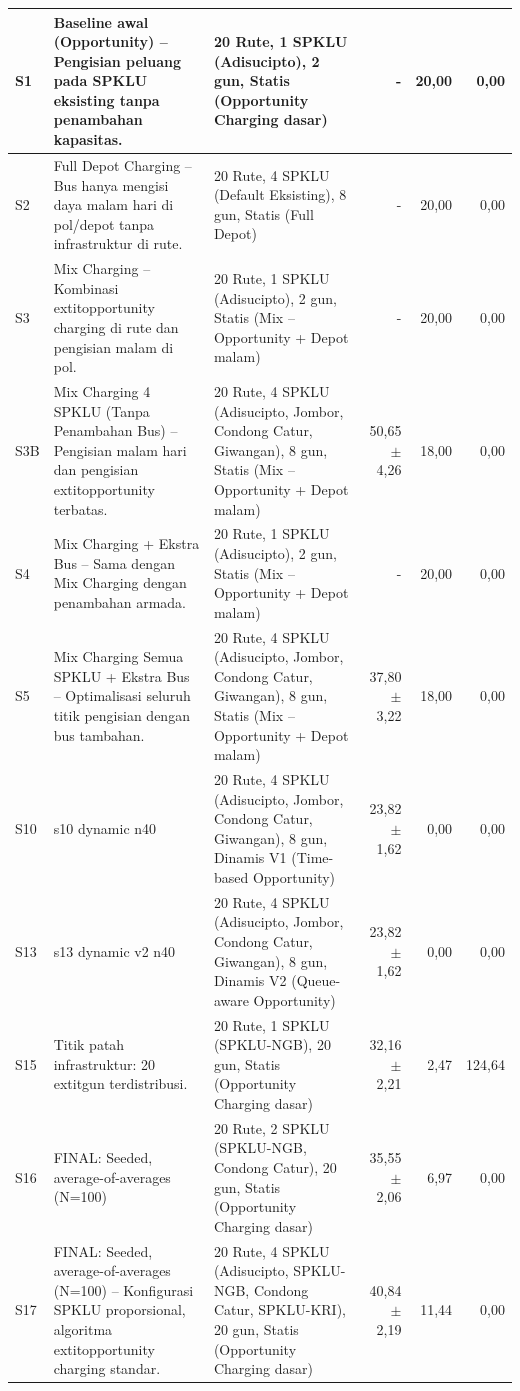 \begin{center}
\begin{longtable}{|l|p{2.5cm}|p{2.5cm}|r|r|r|}
\hline
\endlastfoot
S1 & Baseline awal (Opportunity) -- Pengisian peluang pada SPKLU eksisting tanpa penambahan kapasitas. & 20 Rute, 1 SPKLU (Adisucipto), 2 gun, Statis (Opportunity Charging dasar) & - & 20,00 & 0,00 \\ \hline
S2 & Full Depot Charging -- Bus hanya mengisi daya malam hari di pol/depot tanpa infrastruktur di rute. & 20 Rute, 4 SPKLU (Default Eksisting), 8 gun, Statis (Full Depot) & - & 20,00 & 0,00 \\ \hline
S3 & Mix Charging -- Kombinasi 	extit{opportunity charging} di rute dan pengisian malam di pol. & 20 Rute, 1 SPKLU (Adisucipto), 2 gun, Statis (Mix -- Opportunity + Depot malam) & - & 20,00 & 0,00 \\ \hline
S3B & Mix Charging 4 SPKLU (Tanpa Penambahan Bus) -- Pengisian malam hari dan pengisian 	extit{opportunity} terbatas. & 20 Rute, 4 SPKLU (Adisucipto, Jombor, Condong Catur, Giwangan), 8 gun, Statis (Mix -- Opportunity + Depot malam) & 50,65 $\pm$ 4,26 & 18,00 & 0,00 \\ \hline
S4 & Mix Charging + Ekstra Bus -- Sama dengan Mix Charging dengan penambahan armada. & 20 Rute, 1 SPKLU (Adisucipto), 2 gun, Statis (Mix -- Opportunity + Depot malam) & - & 20,00 & 0,00 \\ \hline
S5 & Mix Charging Semua SPKLU + Ekstra Bus -- Optimalisasi seluruh titik pengisian dengan bus tambahan. & 20 Rute, 4 SPKLU (Adisucipto, Jombor, Condong Catur, Giwangan), 8 gun, Statis (Mix -- Opportunity + Depot malam) & 37,80 $\pm$ 3,22 & 18,00 & 0,00 \\ \hline
S10 & s10 dynamic n40 & 20 Rute, 4 SPKLU (Adisucipto, Jombor, Condong Catur, Giwangan), 8 gun, Dinamis V1 (Time-based Opportunity) & 23,82 $\pm$ 1,62 & 0,00 & 0,00 \\ \hline
S13 & s13 dynamic v2 n40 & 20 Rute, 4 SPKLU (Adisucipto, Jombor, Condong Catur, Giwangan), 8 gun, Dinamis V2 (Queue-aware Opportunity) & 23,82 $\pm$ 1,62 & 0,00 & 0,00 \\ \hline
S15 & Titik patah infrastruktur: 20 	extit{gun} terdistribusi. & 20 Rute, 1 SPKLU (SPKLU-NGB), 20 gun, Statis (Opportunity Charging dasar) & 32,16 $\pm$ 2,21 & 2,47 & 124,64 \\ \hline
S16 & FINAL: Seeded, average-of-averages (N=100) & 20 Rute, 2 SPKLU (SPKLU-NGB, Condong Catur), 20 gun, Statis (Opportunity Charging dasar) & 35,55 $\pm$ 2,06 & 6,97 & 0,00 \\ \hline
S17 & FINAL: Seeded, average-of-averages (N=100) -- Konfigurasi SPKLU proporsional, algoritma 	extit{opportunity charging} standar. & 20 Rute, 4 SPKLU (Adisucipto, SPKLU-NGB, Condong Catur, SPKLU-KRI), 20 gun, Statis (Opportunity Charging dasar) & 40,84 $\pm$ 2,19 & 11,44 & 0,00 \\ \hline

\end{longtable}
\end{center}
